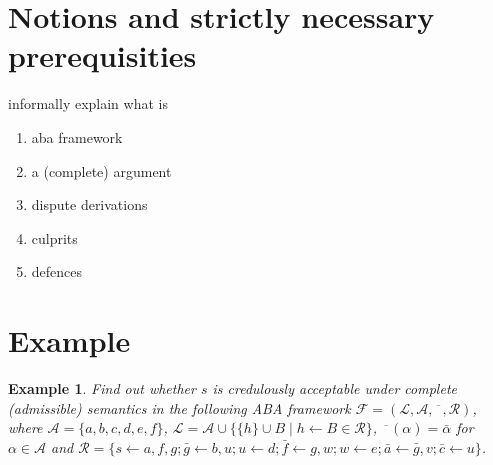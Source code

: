 \documentclass[conference]{IEEEtran}
\newtheorem{example}{Example}[section]
\newcommand{\frF}{\ensuremath{\mathcal{F}}\xspace}
\newcommand{\frL}{\ensuremath{\mathcal{L}}\xspace}
\newcommand{\frA}{\ensuremath{\mathcal{A}}\xspace}
\newcommand{\frCtr}{\ensuremath{\overline{\phantom{x}}}\xspace}
\newcommand{\frR}{\ensuremath{\mathcal{R}}\xspace}
\newcommand{\frTup}{\ensuremath{(\frL,\frA,\frCtr,\frR)}\xspace}
\newcommand{\fr}{\ensuremath{\frF = \frTup}\xspace}
\newcommand{\rulH}{\ensuremath{h}\xspace}
\newcommand{\rulB}{\ensuremath{B}\xspace}
\newcommand{\rul}{\ensuremath{\rulH \leftarrow \rulB}\xspace}
\newcommand{\rulA}[2]{\ensuremath{#1 \leftarrow #2}\xspace}
\begin{document}
\section{Notions and strictly necessary prerequisities}
informally explain what is
\begin{enumerate}
  \item aba framework
  \item a (complete) argument
  \item dispute derivations
  \item culprits
  \item defences
\end{enumerate}

\section{Example}

\begin{example}\label{ex:framework}
  Find out whether $s$ is credulously acceptable under complete (admissible) semantics in the following ABA framework \fr, where $\frA = \{ a,b,c,d,e,f \}$, $\frL = \frA \cup \big\{ \{ \rulH \} \cup \rulB  \mid  \rul \in \frR \big\}$, $\frCtr(\alpha) = \bar{\alpha}$ for $\alpha \in \frA$ and $\frR = \{ \rulA{s}{a,f,g}; \rulA{\bar{g}}{b,u}; \rulA{u}{d}; \rulA{\bar{f}}{g,w}; \rulA{w}{e};\rulA{\bar{a}}{\bar{g},v};\rulA{\bar{c}}{u} \}$.
\end{example}
\end{document}
